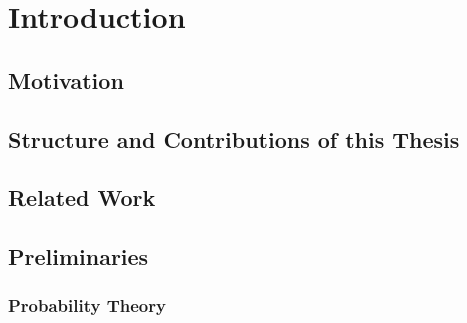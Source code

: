 \chapter{Introduction}

\section{Motivation}


\section{Structure and Contributions of this Thesis}


\section{Related Work}


\section{Preliminaries}


\subsection{Probability Theory}

